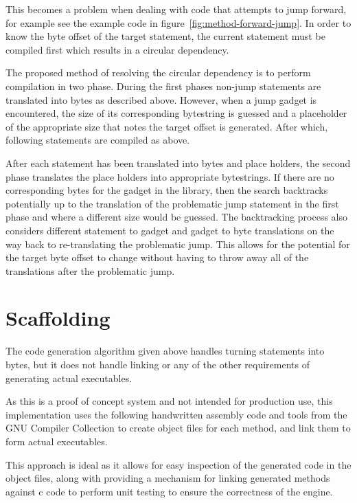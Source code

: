     This becomes a problem when dealing with code that attempts to jump forward,
    for example see the example code in figure~\ref{fig:method-forward-jump}.
    In order to know the byte offset of the target statement, the current
    statement must be compiled first which results in a circular dependency.


    The proposed method of resolving the circular dependency is to perform
    compilation in two phase. During the first phases non-jump statements are
    translated into bytes as described above. However, when a jump gadget is
    encountered, the size of its corresponding bytestring is guessed and a
    placeholder of the appropriate size that notes the target offset is
    generated. After which, following statements are compiled as above.

    After each statement has been translated into bytes and place holders, the
    second phase translates the place holders into appropriate bytestrings. If
    there are no corresponding bytes for the gadget in the library, then the
    search backtracks potentially up to the translation of the problematic jump
    statement in the first phase and where a different size would be guessed.
    The backtracking process also considers different statement to gadget and
    gadget to byte translations on the way back to re-translating the problematic
    jump. This allows for the potential for the target byte offset to change
    without having to throw away all of the translations after the problematic
    jump.

    \section{Scaffolding}

    The code generation algorithm given above handles turning statements into
    bytes, but it does not handle linking or any of the other requirements of
    generating actual executables.

    As this is a proof of concept system and not intended for production use,
    this implementation uses the following handwritten assembly code and tools
    from the GNU Compiler Collection to create object files for each method, and
    link them to form actual executables.

    This approach is ideal as it allows for easy inspection of the generated
    code in the object files, along with providing a mechanism for linking
    generated methods against c code to perform unit testing to ensure the
    correctness of the engine.

